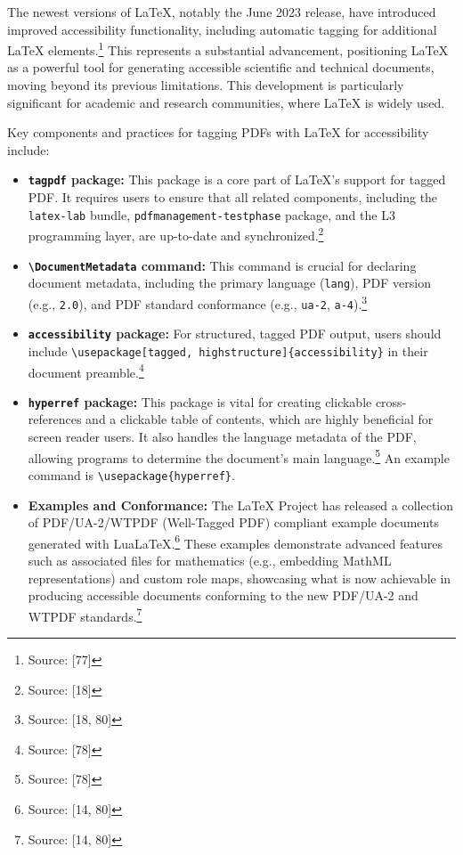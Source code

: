 The newest versions of LaTeX, notably the June 2023 release, have introduced improved accessibility functionality, including automatic tagging for additional LaTeX elements.\footnote{Source: [77]} This represents a substantial advancement, positioning LaTeX as a powerful tool for generating accessible scientific and technical documents, moving beyond its previous limitations. This development is particularly significant for academic and research communities, where LaTeX is widely used.

Key components and practices for tagging PDFs with LaTeX for accessibility include:
\begin{itemize}[noitemsep,topsep=0pt]
    \item \textbf{\texttt{tagpdf} package:} This package is a core part of LaTeX's support for tagged PDF. It requires users to ensure that all related components, including the \texttt{latex-lab} bundle, \texttt{pdfmanagement-testphase} package, and the L3 programming layer, are up-to-date and synchronized.\footnote{Source: [18]}
    \item \textbf{\texttt{\textbackslash DocumentMetadata} command:} This command is crucial for declaring document metadata, including the primary language (\texttt{lang}), PDF version (e.g., \texttt{2.0}), and PDF standard conformance (e.g., \texttt{ua-2}, \texttt{a-4}).\footnote{Source: [18, 80]}
    \item \textbf{\texttt{accessibility} package:} For structured, tagged PDF output, users should include \texttt{\textbackslash usepackage[tagged, highstructure]\{accessibility\}} in their document preamble.\footnote{Source: [78]}
    \item \textbf{\texttt{hyperref} package:} This package is vital for creating clickable cross-references and a clickable table of contents, which are highly beneficial for screen reader users. It also handles the language metadata of the PDF, allowing programs to determine the document's main language.\footnote{Source: [78]} An example command is \texttt{\textbackslash usepackage\{hyperref\}}.
    \item \textbf{Examples and Conformance:} The LaTeX Project has released a collection of PDF/UA-2/WTPDF (Well-Tagged PDF) compliant example documents generated with LuaLaTeX.\footnote{Source: [14, 80]} These examples demonstrate advanced features such as associated files for mathematics (e.g., embedding MathML representations) and custom role maps, showcasing what is now achievable in producing accessible documents conforming to the new PDF/UA-2 and WTPDF standards.\footnote{Source: [14, 80]}
\end{itemize}

